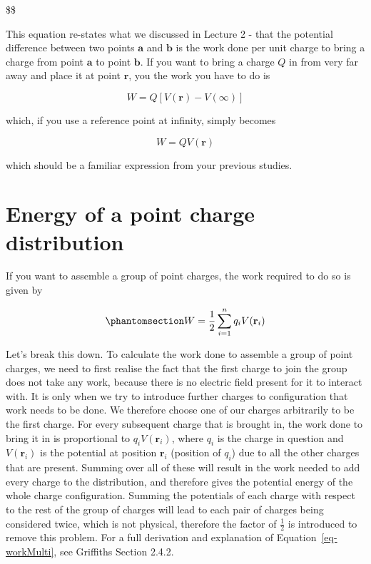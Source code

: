 \documentclass[
  letterpaper,
  DIV=11,
  numbers=noendperiod]{scrreprt}
\begin{document}
\$\$

This equation re-states what we discussed in Lecture 2 - that the
potential difference between two points \(\mathrm{\mathbf{a}}\) and
\(\mathrm{\mathbf{b}}\) is the work done per unit charge to bring a
charge from point \(\mathrm{\mathbf{a}}\) to point
\(\mathrm{\mathbf{b}}\). If you want to bring a charge \(Q\) in from
very far away and place it at point \(\mathrm{\mathbf{r}}\), you the
work you have to do is

\[W = Q[V(\mathrm{\mathbf{r}}) - V(\infty)]\]

which, if you use a reference point at infinity, simply becomes

\[W = Q V(\mathrm{\mathbf{r}})\]

which should be a familiar expression from your previous studies.

\section{Energy of a point charge
distribution}\label{energy-of-a-point-charge-distribution}

If you want to assemble a group of point charges, the work required to
do so is given by

\begin{equation}\phantomsection\label{eq-workMulti}{ W = \frac{1}{2} \sum_{i=1}^n q_i V(\mathrm{\mathbf{r}}_i) }\end{equation}

Let's break this down. To calculate the work done to assemble a group of
point charges, we need to first realise the fact that the first charge
to join the group does not take any work, because there is no electric
field present for it to interact with. It is only when we try to
introduce further charges to configuration that work needs to be done.
We therefore choose one of our charges arbitrarily to be the first
charge. For every subsequent charge that is brought in, the work done to
bring it in is proportional to \(q_i V(\mathrm{\mathbf{r}}_i)\), where
\(q_i\) is the charge in question and \(V(\mathrm{\mathbf{r}}_i)\) is
the potential at position \(\mathrm{\mathbf{r}}_i\) (position of
\(q_i\)) due to all the other charges that are present. Summing over all
of these will result in the work needed to add every charge to the
distribution, and therefore gives the potential energy of the whole
charge configuration. Summing the potentials of each charge with respect
to the rest of the group of charges will lead to each pair of charges
being considered twice, which is not physical, therefore the factor of
\(\frac{1}{2}\) is introduced to remove this problem. For a full
derivation and explanation of Equation~\ref{eq-workMulti}, see Griffiths
Section 2.4.2.
\end{document}
